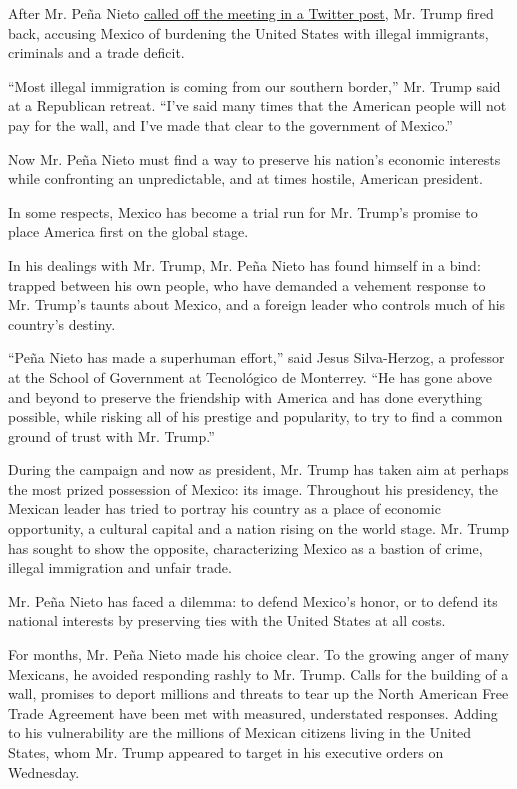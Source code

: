 After Mr. Peña Nieto
\href{https://twitter.com/EPN/status/824660333964824576}{called off the
meeting in a Twitter post}, Mr. Trump fired back, accusing Mexico of
burdening the United States with illegal immigrants, criminals and a
trade deficit.

``Most illegal immigration is coming from our southern border,'' Mr.
Trump said at a Republican retreat. ``I've said many times that the
American people will not pay for the wall, and I've made that clear to
the government of Mexico.''

Now Mr. Peña Nieto must find a way to preserve his nation's economic
interests while confronting an unpredictable, and at times hostile,
American president.

In some respects, Mexico has become a trial run for Mr. Trump's promise
to place America first on the global stage.

In his dealings with Mr. Trump, Mr. Peña Nieto has found himself in a
bind: trapped between his own people, who have demanded a vehement
response to Mr. Trump's taunts about Mexico, and a foreign leader who
controls much of his country's destiny.

``Peña Nieto has made a superhuman effort,'' said Jesus Silva-Herzog, a
professor at the School of Government at Tecnológico de Monterrey. ``He
has gone above and beyond to preserve the friendship with America and
has done everything possible, while risking all of his prestige and
popularity, to try to find a common ground of trust with Mr. Trump.''

During the campaign and now as president, Mr. Trump has taken aim at
perhaps the most prized possession of Mexico: its image. Throughout his
presidency, the Mexican leader has tried to portray his country as a
place of economic opportunity, a cultural capital and a nation rising on
the world stage. Mr. Trump has sought to show the opposite,
characterizing Mexico as a bastion of crime, illegal immigration and
unfair trade.

Mr. Peña Nieto has faced a dilemma: to defend Mexico's honor, or to
defend its national interests by preserving ties with the United States
at all costs.

For months, Mr. Peña Nieto made his choice clear. To the growing anger
of many Mexicans, he avoided responding rashly to Mr. Trump. Calls for
the building of a wall, promises to deport millions and threats to tear
up the North American Free Trade Agreement have been met with measured,
understated responses. Adding to his vulnerability are the millions of
Mexican citizens living in the United States, whom Mr. Trump appeared to
target in his executive orders on Wednesday.

